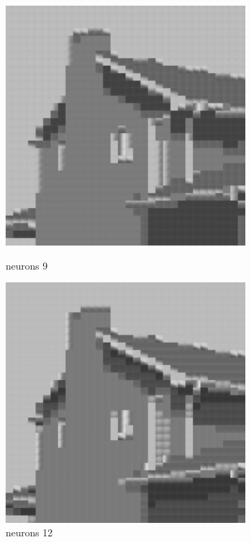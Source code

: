 \documentclass[../IDP_Task5_Karwowski_Kowalewski.tex]{subfiles}
\begin{document}
{{        \begin{figure}[!htbp]
            \begin{minipage}[c]{0.45\linewidth}
                \centering
                \includegraphics[width=0.8\textwidth]{img/kowalewski/crop_size_8_neurons_9.png}
                \caption{neurons 9}
            \end{minipage}\hfill
            \begin{minipage}[c]{0.45\linewidth}
                \centering
                \includegraphics[width=0.8\textwidth]{img/kowalewski/crop_size_8_neurons_12.png}
                \caption{neurons 12}
            \end{minipage}
        \end{figure}

}}
\end{document}
